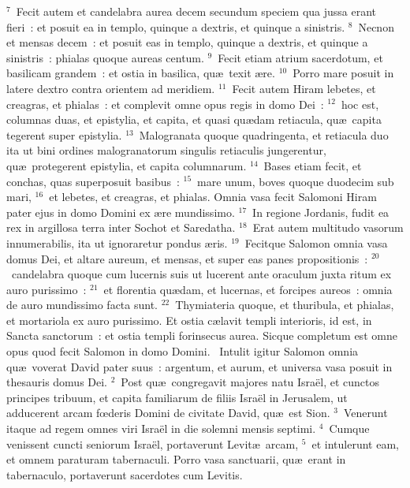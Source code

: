${}^{7}$~Fecit autem et candelabra aurea decem secundum speciem qua jussa erant fieri~: et posuit ea in templo, quinque a dextris, et quinque a sinistris.
${}^{8}$~Necnon et mensas decem~: et posuit eas in templo, quinque a dextris, et quinque a sinistris~: phialas quoque aureas centum.
${}^{9}$~Fecit etiam atrium sacerdotum, et basilicam grandem~: et ostia in basilica, qu\ae\ texit \ae re.
${}^{10}$~Porro mare posuit in latere dextro contra orientem ad meridiem.
${}^{11}$~Fecit autem Hiram lebetes, et creagras, et phialas~: et complevit omne opus regis in domo Dei~:
${}^{12}$~hoc est, columnas duas, et epistylia, et capita, et quasi qu\ae dam retiacula, qu\ae\ capita tegerent super epistylia.
${}^{13}$~Malogranata quoque quadringenta, et retiacula duo ita ut bini ordines malogranatorum singulis retiaculis jungerentur, qu\ae\ protegerent epistylia, et capita columnarum.
${}^{14}$~Bases etiam fecit, et conchas, quas superposuit basibus~:
${}^{15}$~mare unum, boves quoque duodecim sub mari,
${}^{16}$~et lebetes, et creagras, et phialas. Omnia vasa fecit Salomoni Hiram pater ejus in domo Domini ex \ae re mundissimo.
${}^{17}$~In regione Jordanis, fudit ea rex in argillosa terra inter Sochot et Saredatha.
${}^{18}$~Erat autem multitudo vasorum innumerabilis, ita ut ignoraretur pondus \ae ris.
${}^{19}$~Fecitque Salomon omnia vasa domus Dei, et altare aureum, et mensas, et super eas panes propositionis~:
${}^{20}$~candelabra quoque cum lucernis suis ut lucerent ante oraculum juxta ritum ex auro purissimo~:
${}^{21}$~et florentia qu\ae dam, et lucernas, et forcipes aureos~: omnia de auro mundissimo facta sunt.
${}^{22}$~Thymiateria quoque, et thuribula, et phialas, et mortariola ex auro purissimo. Et ostia c\ae lavit templi interioris, id est, in Sancta sanctorum~: et ostia templi forinsecus aurea. Sicque completum est omne opus quod fecit Salomon in domo Domini.
~\lettrine[lines=10,image=true,loversize=0.05,lraise=-0.03]{I}{}ntulit igitur Salomon omnia qu\ae\ voverat David pater suus~: argentum, et aurum, et universa vasa posuit in thesauris domus Dei.
${}^{2}$~Post qu\ae\ congregavit majores natu Isra\"el, et cunctos principes tribuum, et capita familiarum de filiis Isra\"el in Jerusalem, ut adducerent arcam fœderis Domini de civitate David, qu\ae\ est Sion.
${}^{3}$~Venerunt itaque ad regem omnes viri Isra\"el in die solemni mensis septimi.
${}^{4}$~Cumque venissent cuncti seniorum Isra\"el, portaverunt Levit\ae\ arcam,
${}^{5}$~et intulerunt eam, et omnem paraturam tabernaculi. Porro vasa sanctuarii, qu\ae\ erant in tabernaculo, portaverunt sacerdotes cum Levitis.
